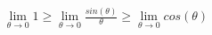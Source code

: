 \documentclass[preview]{standalone}
\begin{document}
\begin{align*}
\lim_{\theta\to0} 1 \geq \lim_{\theta\to0} \frac{sin(\theta)}{\theta} \geq \lim_{\theta\to0} cos(\theta)
\end{align*}
\end{document}

